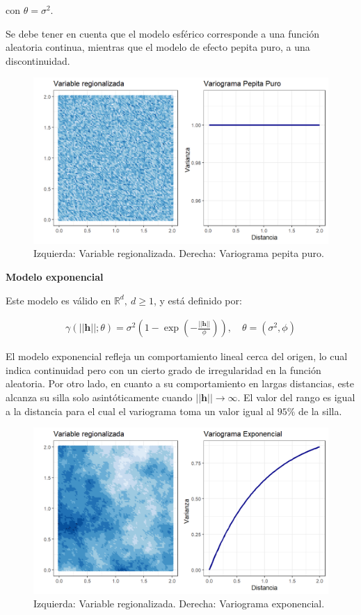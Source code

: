 \documentclass[
]{book}
\begin{document}
con \(\theta=\sigma^2\).

Se debe tener en cuenta que el modelo esférico corresponde a una función aleatoria continua, mientras que el modelo de efecto pepita puro, a una discontinuidad.

\begin{figure}
\includegraphics[width=17.78in]{figuras/otros/pepita_var} \caption{Izquierda: Variable regionalizada. Derecha: Variograma pepita puro.}\label{fig:unnamed-chunk-2}
\end{figure}

\textbf{Modelo exponencial}

Este modelo es válido en \(\mathbb{R}^d,\ d\geq 1\), y está definido por:

\begin{align}
    \gamma(||\textbf{h}||;\theta)=\sigma^2 \left(1-\exp\left(-\frac{||\textbf{h}||}{\phi}\right) \right),\quad \theta=(\sigma^2,\phi)
\end{align}

El modelo exponencial refleja un comportamiento lineal cerca del origen, lo cual indica continuidad pero con un cierto grado de irregularidad en la función aleatoria. Por otro lado, en cuanto a su comportamiento en largas distancias, este alcanza su silla solo asintóticamente cuando \(||\textbf{h}||\to \infty\). El valor del rango es igual a la distancia para el cual el variograma toma un valor igual al \(95\%\) de la silla.

\begin{figure}
\includegraphics[width=17.78in]{figuras/otros/exp_var} \caption{Izquierda: Variable regionalizada. Derecha: Variograma exponencial.}\label{fig:unnamed-chunk-3}
\end{figure}
\end{document}

